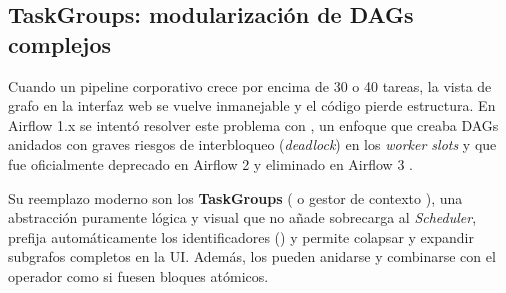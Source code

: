 \subsection{TaskGroups: modularización de DAGs complejos}

Cuando un pipeline corporativo crece por encima de 30 o 40 tareas, la vista de grafo en la interfaz web se vuelve inmanejable y el código pierde estructura. En Airflow 1.x se intentó resolver este problema con , un enfoque que creaba DAGs anidados con graves riesgos de interbloqueo (\textit{deadlock}) en los \textit{worker slots} y que fue oficialmente deprecado en Airflow 2 y eliminado en Airflow 3 .

Su reemplazo moderno son los \textbf{TaskGroups} ( o gestor de contexto ), una abstracción puramente lógica y visual que no añade sobrecarga al \textit{Scheduler}, prefija automáticamente los identificadores () y permite colapsar y expandir subgrafos completos en la UI. Además, los  pueden anidarse y combinarse con el operador \code{>>} como si fuesen bloques atómicos.

